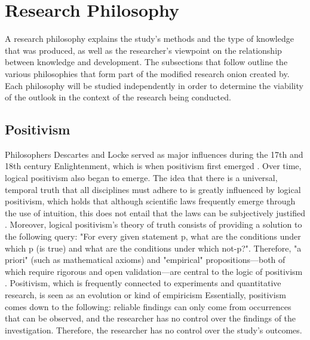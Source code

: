 \section{Research Philosophy}
\par{A research philosophy explains the study's methods and the type of knowledge that was produced, as well as the researcher's viewpoint on the relationship between knowledge and development. The subsections that follow outline the various philosophies that form part of the modified research onion created by\cite{mardiana2020modifying}. Each philosophy will be studied independently in order to determine the viability of the outlook in the context of the research being conducted.}
\subsection{Positivism}
\par{Philosophers Descartes and Locke served as major influences during the 17th and 18th century Enlightenment, which is when positivism first emerged \citep{park2020positivism}. Over time, logical positivism also began to emerge. The idea that there is a universal, temporal truth that all disciplines must adhere to is greatly influenced by logical positivism, which holds that although scientific laws frequently emerge through the use of intuition, this does not entail that the laws can be subjectively justified \citep{luczak2013beyond}. Moreover, logical positivism's theory of truth consists of providing a solution to the following query: "For every given statement p, what are the conditions under which p (is true) and what are the conditions under which not-p?". Therefore, "a priori" (such as mathematical axioms) and "empirical" propositions—both of which require rigorous and open validation—are central to the logic of positivism \citep{luczak2013beyond}. Positivism, which is frequently connected to experiments and quantitative research, is seen as an evolution or kind of empiricism \citep{potrac2014interpretivism} Essentially, positivism comes down to the following: reliable findings can only come from occurrences that can be observed, and the researcher has no control over the findings of the investigation. Therefore, the researcher has no control over the study's outcomes.}
